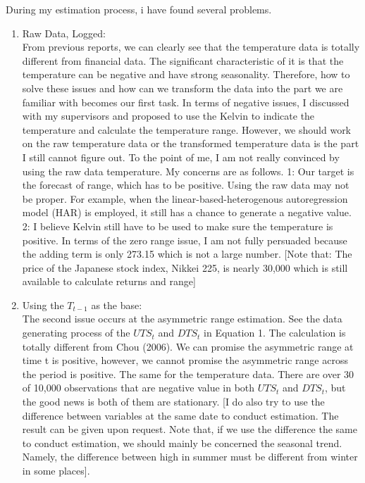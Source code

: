 \documentclass{article}
\begin{document}
	During my estimation process, i have found several problems.
	\begin{enumerate}
		\item Raw Data, Logged: ~\\
		From previous reports, we can clearly see that the temperature data is totally different from financial data. The significant characteristic of it is that the temperature can be negative and have strong seasonality. Therefore, how to solve these issues and how can we transform the data into the part we are familiar with becomes our first task. In terms of negative issues, I discussed with my supervisors and proposed to use the Kelvin to indicate the temperature and calculate the temperature range. However, we should work on the raw temperature data or the transformed temperature data is the part I still cannot figure out.  To the point of me, I am not really convinced by using the raw data temperature. My concerns are as follows. 1: Our target is the forecast of range, which has to be positive.  Using the raw data may not be proper. For example, when the linear-based-heterogenous autoregression model (HAR) is employed, it still has a chance to generate a negative value. 2:  I believe Kelvin still have to be used to make sure the temperature is positive. In terms of the zero range issue, I am not fully persuaded because the adding term is only 273.15 which is not a large number. [Note that: The price of the Japanese stock index, Nikkei 225, is nearly 30,000 which is still available to calculate returns and range] 
		
		\item Using the $T_{t-1}$ as the base: ~\\
		The second issue occurs at the asymmetric range estimation. See the data generating process of the $UTS_{t}$ and $DTS_{t}$ in Equation 1.  The calculation is totally different from Chou (2006). We can promise the asymmetric range at time t is positive, however, we cannot promise the asymmetric range across the period is positive. The same for the temperature data. There are over 30 of 10,000 observations that are negative value in both $UTS_{t}$ and $DTS_{t}$, but the good news is both of them are stationary. [I do also try to use the difference between variables at the same date to conduct estimation. The result can be given upon request. Note that, if we use the difference the same to conduct estimation, we should mainly be concerned the seasonal trend. Namely, the difference between high in summer must be different from winter in some places].
		

\end{enumerate}
\end{document}
